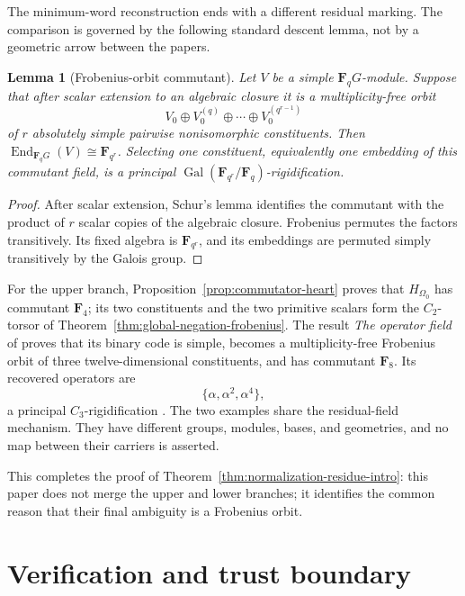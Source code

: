 \documentclass[11pt]{article}
\newtheorem{lemma}[theorem]{Lemma}
\theoremstyle{definition}
\theoremstyle{remark}
\newcommand{\F}{\mathbf F}
\newcommand{\End}{\operatorname{End}}
\newcommand{\Gal}{\operatorname{Gal}}
\begin{document}
The minimum-word reconstruction \cite{RuddPassant2026} ends with a different
residual marking.  The comparison is governed by the following standard
descent lemma, not by a geometric arrow between the papers.

\begin{lemma}[Frobenius-orbit commutant]
\label{lem:frobenius-orbit-commutant}
Let \(V\) be a simple \(\F_qG\)-module.  Suppose that after scalar extension
to an algebraic closure it is a multiplicity-free orbit
\[
               V_0\oplus V_0^{(q)}\oplus\cdots\oplus V_0^{(q^{r-1})}
\]
of \(r\) absolutely simple pairwise nonisomorphic constituents.  Then
\(\End_{\F_qG}(V)\cong\F_{q^r}\).  Selecting one constituent, equivalently
one embedding of this commutant field, is a principal
\(\Gal(\F_{q^r}/\F_q)\)-rigidification.
\end{lemma}

\begin{proof}
After scalar extension, Schur's lemma identifies the commutant with the
product of \(r\) scalar copies of the algebraic closure.  Frobenius permutes
the factors transitively.  Its fixed algebra is \(\F_{q^r}\), and its
embeddings are permuted simply transitively by the Galois group.
\end{proof}

For the upper branch, Proposition~\ref{prop:commutator-heart} proves that
\(H_{\Omega_0}\) has commutant \(\F_4\); its two constituents and the two
primitive scalars form the \(C_2\)-torsor of
Theorem~\ref{thm:global-negation-frobenius}.  The result \emph{The operator field} of
\cite{RuddPassant2026} proves that its binary code is simple, becomes a
multiplicity-free
Frobenius orbit of three twelve-dimensional constituents, and has commutant
\(\F_8\).  Its recovered
operators are
\[
                         \{\alpha,\alpha^2,\alpha^4\},
\]
a principal \(C_3\)-rigidification \cite{RuddPassant2026}.  The two examples
share the residual-field mechanism.  They have different groups, modules,
bases, and geometries, and no map between their carriers is asserted.

This completes the proof of Theorem~\ref{thm:normalization-residue-intro}:
this paper does not merge the upper and lower branches; it identifies the
common reason that their final ambiguity is a Frobenius orbit.

\section{Verification and trust boundary}
\label{sec:verification}
\end{document}
